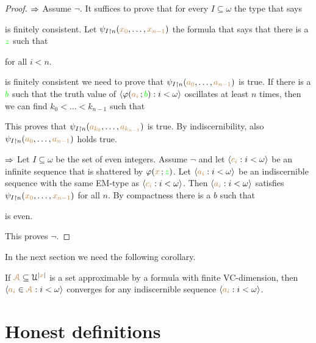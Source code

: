\documentclass[creche.tex]{subfiles}
\begin{document}
\begin{proof}
$\Rightarrow$ Assume $\neg$. It suffices to prove that for every $I\subseteq\omega$ the type that says 


is finitely consistent. Let $\psi_{I\restriction n}({\color{brown} x_0},\dots,{\color{brown} x_{n-1}})$ the formula that says that there is a ${\color{green} z}$ such that

\quad for all $i<n$.

is finitely consistent we need to prove that $\psi_{I\restriction n}({\color{brown} a_0},\dots,{\color{brown} a_{n-1}})$ is true. If there is a ${\color{green} b}$ such that the truth value of $\langle\varphi({\color{brown} a_i}\,;{\color{green} b}):i<\omega\rangle$ oscillates at least $n$ times, then we can find $k_0<\dots<k_{n-1}$ such that 



This proves that $\psi_{I\restriction n}({\color{brown} a_{k_0}},\dots,{\color{brown} a_{k_{n-1}}})$ is true. By indiscernibility, also $\psi_{I\restriction n}({\color{brown} a_0},\dots,{\color{brown} a_{n-1}})$ holds true.

$\Rightarrow$ Let $I\subseteq\omega$ be the set of even integers. Assume $\neg$ and let  $\langle{\color{brown}c_i}:i<\omega\rangle$ be an infinite sequence that is shattered by $\varphi({\color{brown} x}\,;{\color{green} z})$.
Let  $\langle{\color{brown}a_i}:i<\omega\rangle$ be an indiscernible sequence with the same EM-type as $\langle{\color{brown}c_i}:i<\omega\rangle$. Then $\langle{\color{brown}a_i}:i<\omega\rangle$ satisfies $\psi_{I\restriction n}({\color{brown} x_0},\dots,{\color{brown} x_{n-1}})$ for all $n$. By compactness there is a $b$ such that

\quad is even.

This proves $\neg$.
\end{proof}

In the next section we need the following corollary.

\begin{corollary}\label{corol_altrank}
If ${\color{brown}{\EuScript A}}\subseteq\EuScript U^{|{\color{brown} x}|}$ is a set approximable by a formula with finite VC-dimension, then $\langle{\color{brown}a_i}\in{\color{brown}{\EuScript A}}:i<\omega\rangle$ converges for any indiscernible sequence $\langle{\color{brown}a_i}:i<\omega\rangle$.\QED
\end{corollary}


\section{Honest definitions}
\label{-theory}
\end{document}
